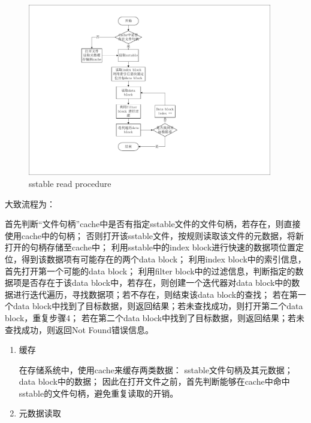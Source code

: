 \begin{enumerate}
\begin{enumerate}
\begin{figure}[H]
	\centering
	\includegraphics[width=0.95\textwidth]{pdf/sstable_read_procedure.pdf}
	\caption{sstable read procedure}
	\label{sstable_read_procedure}
\end{figure}

大致流程为：

首先判断“文件句柄”cache中是否有指定sstable文件的文件句柄，若存在，则直接使用cache中的句柄；
否则打开该sstable文件，按规则读取该文件的元数据，将新打开的句柄存储至cache中；
利用sstable中的index block进行快速的数据项位置定位，得到该数据项有可能存在的两个data block；
利用index block中的索引信息，首先打开第一个可能的data block；
利用filter block中的过滤信息，判断指定的数据项是否存在于该data block中，若存在，则创建一个迭代器对data block中的数据进行迭代遍历，寻找数据项；若不存在，则结束该data block的查找；
若在第一个data block中找到了目标数据，则返回结果；若未查找成功，则打开第二个data block，重复步骤4；
若在第二个data block中找到了目标数据，则返回结果；若未查找成功，则返回Not Found错误信息。

		\begin{enumerate}
			\item 缓存 
			

			在存储系统中，使用cache来缓存两类数据：
sstable文件句柄及其元数据；
data block中的数据；
因此在打开文件之前，首先判断能够在cache中命中sstable的文件句柄，避免重复读取的开销。

			\item 元数据读取 
			


\end{enumerate}
\end{enumerate}
\end{enumerate}
